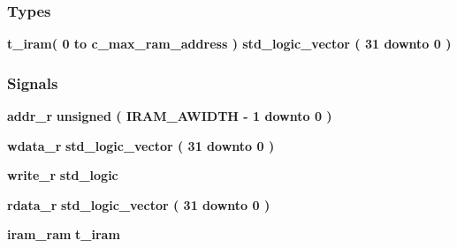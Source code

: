 \subsubsection*{Types}
 \begin{DoxyCompactItemize}
\item 
{\bfseries {\bf t\+\_\+iram}{\bfseries \textcolor{vhdlchar}{(}\textcolor{vhdlchar}{ }\textcolor{vhdlchar}{ } \textcolor{vhdldigit}{0} \textcolor{vhdlchar}{ }\textcolor{keywordflow}{to}\textcolor{vhdlchar}{ }\textcolor{vhdlchar}{ }\textcolor{vhdlchar}{ }\textcolor{vhdlchar}{ }{\bfseries {\bf c\+\_\+max\+\_\+ram\+\_\+address}} \textcolor{vhdlchar}{ }\textcolor{vhdlchar}{)}\textcolor{vhdlchar}{ }\textcolor{vhdlchar}{ }\textcolor{comment}{std\+\_\+logic\+\_\+vector}\textcolor{vhdlchar}{ }\textcolor{vhdlchar}{(}\textcolor{vhdlchar}{ }\textcolor{vhdlchar}{ } \textcolor{vhdldigit}{31} \textcolor{vhdlchar}{ }\textcolor{keywordflow}{downto}\textcolor{vhdlchar}{ }\textcolor{vhdlchar}{ } \textcolor{vhdldigit}{0} \textcolor{vhdlchar}{ }\textcolor{vhdlchar}{)}\textcolor{vhdlchar}{ }}} 
\end{DoxyCompactItemize}
\subsubsection*{Signals}
 \begin{DoxyCompactItemize}
\item 
{\bf addr\+\_\+r} {\bfseries \textcolor{comment}{unsigned}\textcolor{vhdlchar}{ }\textcolor{vhdlchar}{(}\textcolor{vhdlchar}{ }\textcolor{vhdlchar}{ }\textcolor{vhdlchar}{ }\textcolor{vhdlchar}{ }{\bfseries {\bf I\+R\+A\+M\+\_\+\+A\+W\+I\+D\+TH}} \textcolor{vhdlchar}{-\/}\textcolor{vhdlchar}{ } \textcolor{vhdldigit}{1} \textcolor{vhdlchar}{ }\textcolor{keywordflow}{downto}\textcolor{vhdlchar}{ }\textcolor{vhdlchar}{ } \textcolor{vhdldigit}{0} \textcolor{vhdlchar}{ }\textcolor{vhdlchar}{)}\textcolor{vhdlchar}{ }} 
\item 
{\bf wdata\+\_\+r} {\bfseries \textcolor{comment}{std\+\_\+logic\+\_\+vector}\textcolor{vhdlchar}{ }\textcolor{vhdlchar}{(}\textcolor{vhdlchar}{ }\textcolor{vhdlchar}{ } \textcolor{vhdldigit}{31} \textcolor{vhdlchar}{ }\textcolor{keywordflow}{downto}\textcolor{vhdlchar}{ }\textcolor{vhdlchar}{ } \textcolor{vhdldigit}{0} \textcolor{vhdlchar}{ }\textcolor{vhdlchar}{)}\textcolor{vhdlchar}{ }} 
\item 
{\bf write\+\_\+r} {\bfseries \textcolor{comment}{std\+\_\+logic}\textcolor{vhdlchar}{ }} 
\item 
{\bf rdata\+\_\+r} {\bfseries \textcolor{comment}{std\+\_\+logic\+\_\+vector}\textcolor{vhdlchar}{ }\textcolor{vhdlchar}{(}\textcolor{vhdlchar}{ }\textcolor{vhdlchar}{ } \textcolor{vhdldigit}{31} \textcolor{vhdlchar}{ }\textcolor{keywordflow}{downto}\textcolor{vhdlchar}{ }\textcolor{vhdlchar}{ } \textcolor{vhdldigit}{0} \textcolor{vhdlchar}{ }\textcolor{vhdlchar}{)}\textcolor{vhdlchar}{ }} 
\item 
{\bf iram\+\_\+ram} {\bfseries {\bfseries {\bf t\+\_\+iram}} \textcolor{vhdlchar}{ }} 
\end{DoxyCompactItemize}
